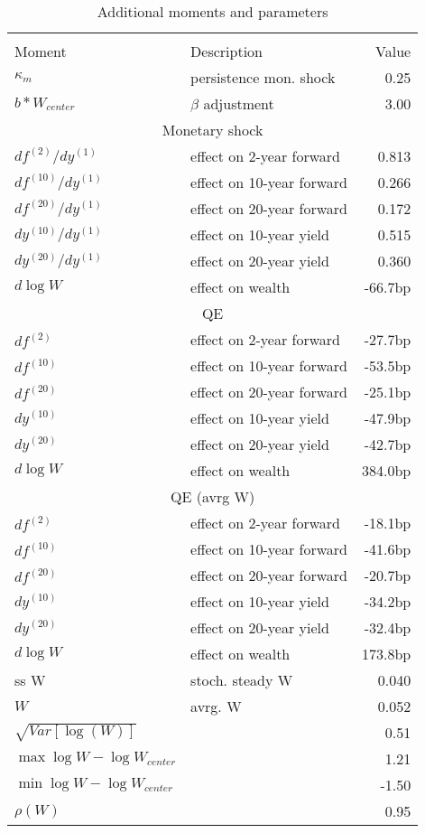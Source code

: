 \begin{table}[htbp]\centering  
 \bgroup  
 \def\arraystretch{1.25}\caption{Additional moments and parameters} 
\begin{tabular}{llr} 
\hline\hline 
\multicolumn{3}{c}{} \\ 
Moment & Description & Value  \\ 
$\kappa_m$ & persistence mon. shock  & 0.25   \\ 
$b*W_{center}$ & $\beta$ adjustment  & 3.00   \\ 
\hline 
\multicolumn{3}{c}{Monetary shock} \\ 
$df^{(2)}/dy^{(1)} $ & effect on 2-year forward  & 0.813 \\ 
$df^{(10)}/dy^{(1)} $ & effect on 10-year forward  & 0.266 \\ 
$df^{(20)}/dy^{(1)} $ & effect on 20-year forward  & 0.172 \\ 
$dy^{(10)}/dy^{(1)} $ & effect on 10-year yield  & 0.515 \\ 
$dy^{(20)}/dy^{(1)} $ & effect on 20-year yield  & 0.360 \\ 
$d\log W$ & effect on wealth  & -66.7bp \\ 
\hline 
\multicolumn{3}{c}{QE} \\ 
$df^{(2)}$ & effect on 2-year forward  & -27.7bp \\ 
$df^{(10)}$ & effect on 10-year forward  & -53.5bp \\ 
$df^{(20)}$ & effect on 20-year forward  & -25.1bp \\ 
$dy^{(10)}$ & effect on 10-year yield  & -47.9bp \\ 
$dy^{(20)}$ & effect on 20-year yield  & -42.7bp \\ 
$d\log W$ & effect on wealth  & 384.0bp \\ 
\hline 
\multicolumn{3}{c}{QE (avrg W)} \\ 
$df^{(2)} $ & effect on 2-year forward  & -18.1bp \\ 
$df^{(10)} $ & effect on 10-year forward  & -41.6bp \\ 
$df^{(20)} $ & effect on 20-year forward  & -20.7bp \\ 
$dy^{(10)} $ & effect on 10-year yield  & -34.2bp \\ 
$dy^{(20)} $ & effect on 20-year yield  & -32.4bp \\ 
$d\log W$ & effect on wealth  & 173.8bp \\ 
\hline 
ss W & stoch. steady W & 0.040   \\ 
$W$ & avrg. W & 0.052   \\ 
$\sqrt{Var[\log(W)]}$ &  & 0.51   \\ 
$\max \log W - \log W_{center} $ &  & 1.21   \\ 
$\min \log W - \log W_{center} $ &  & -1.50   \\ 
$\rho(W)$ &  & 0.95   \\ 
\hline 
\hline\hline 
\end{tabular} 
 \egroup 
\end{table} 

